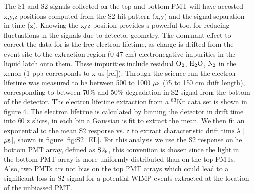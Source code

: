 The S1 and S2 signals collected on the top and bottom PMT will have accosted x,y,z positions computed from the S2 hit pattern (x,y) and the signal separation in time (z). Knowing the xyz position provides a powerful tool for reducing fluctuations in the signals due to detector geometry. The dominant effect to correct the data for is the free electron lifetime, as charge is drifted from the event site to the extraction region (0-47 cm) electronegative impurities in the liquid latch onto them. These impurities include residual $\rm O_2$, $\rm H_2O$, $\rm N_2$ in the xenon (1 ppb corresponds to x us [ref]). Through the science run the electron lifetime was measured to be between 500 to 1000 $\rm \mu s$ (75 to 150 cm drift length), corresponding to between 70\% and 50\% degradation in S2 signal from the bottom of the detector. The electron lifetime extraction from a $\rm^{83}Kr$ data set is shown in figure 4. 
The electron lifetime is calculated by binning the detector in drift time into 60 z slices, in each bin a Gaussian is fit to extract the mean. We then fit an exponential to the mean S2 response vs. z to extract characteristic drift time $\lambda$ [$\rm \mu s$], shown in figure \ref{fig:S2_EL}. For this analysis we use the S2 response on he bottom PMT array, defined as $\rm S2_b$, this convention is chosen since the light in the bottom PMT array is more uniformly distributed than on the top PMTs. Also, two PMTs are not bias on the top PMT arrays which could lead to a significant loss in S2 signal for a potential WIMP events extracted at the location of the unbiassed PMT.


